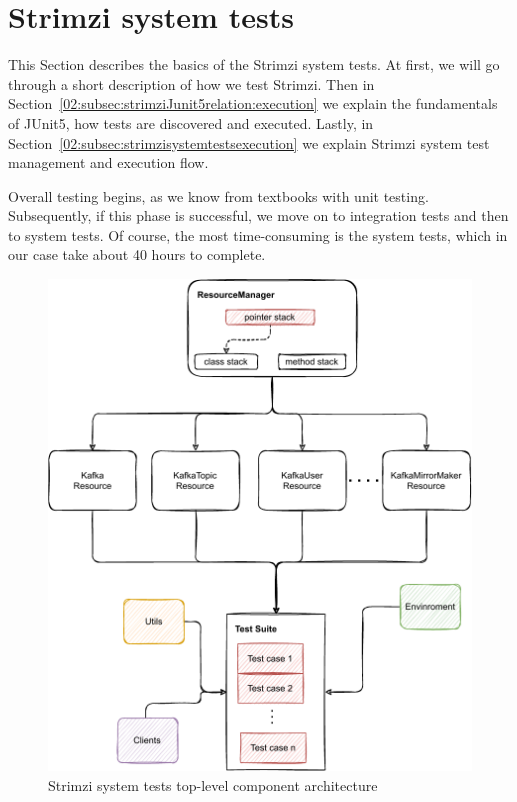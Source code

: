 \section{Strimzi system tests}
\label{02:sec:strimzisystemtests}

This Section describes the basics of the Strimzi system tests.
At first, we will go through a short description of how we test Strimzi.
Then in Section~\ref{02:subsec:strimziJunit5relation:execution} we explain the fundamentals of JUnit5, how tests are discovered and executed.
Lastly, in Section~\ref{02:subsec:strimzisystemtestsexecution} we explain Strimzi system test management and execution flow.

Overall testing begins, as we know from textbooks with unit testing.
Subsequently, if this phase is successful, we move on to integration tests and then to system tests.
Of course, the most time-consuming is the system tests, which in our case take about 40 hours to complete.
\begin{figure}[!ht]
    \centering
    \includegraphics[scale=0.80]{obrazky-figures/02-preliminaries/04-strimzi-system-tests/01-architecture-overall}
    \caption{Strimzi system tests top-level component architecture}
    \label{02d:fig:strimzisystemtestarch}
\end{figure}
